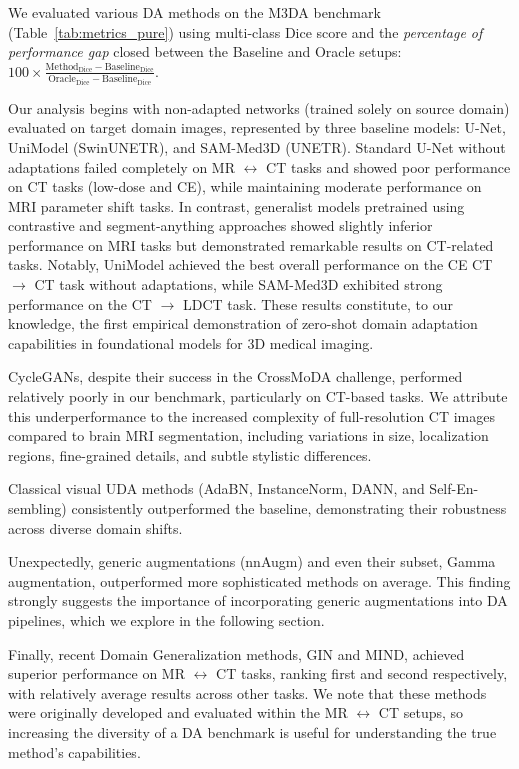 

We evaluated various DA methods on the M3DA benchmark (Table~\ref{tab:metrics_pure}) using multi-class Dice score and the \textit{percentage of performance gap} closed between the Baseline and Oracle setups: $\displaystyle 100\times \frac{\text{Method}_{\text{Dice}} - \text{Baseline}_{\text{Dice}}}{\text{Oracle}_{\text{Dice}} - \text{Baseline}_{\text{Dice}}}$.

Our analysis begins with non-adapted networks (trained solely on source domain) evaluated on target domain images, represented by three baseline models: U-Net, UniModel (SwinUNETR), and SAM-Med3D (UNETR). Standard U-Net without adaptations failed completely on MR $\leftrightarrow$ CT tasks and showed poor performance on CT tasks (low-dose and CE), while maintaining moderate performance on MRI parameter shift tasks. In contrast, generalist models pretrained using contrastive and segment-anything approaches showed slightly inferior performance on MRI tasks but demonstrated remarkable results on CT-related tasks. Notably, UniModel achieved the best overall performance on the CE CT $\rightarrow$ CT task without adaptations, while SAM-Med3D exhibited strong performance on the CT $\rightarrow$ LDCT task. These results constitute, to our knowledge, the first empirical demonstration of zero-shot domain adaptation capabilities in foundational models for 3D medical imaging.

CycleGANs, despite their success in the CrossMoDA challenge, performed relatively poorly in our benchmark, particularly on CT-based tasks. We attribute this underperformance to the increased complexity of full-resolution CT images compared to brain MRI segmentation, including variations in size, localization regions, fine-grained details, and subtle stylistic differences.

Classical visual UDA methods (AdaBN, InstanceNorm, DANN, and Self-En- sembling) consistently outperformed the baseline, demonstrating their robustness across diverse domain shifts. 

Unexpectedly, generic augmentations (nnAugm) and even their subset, Gamma augmentation, outperformed more sophisticated methods on average. This finding strongly suggests the importance of incorporating generic augmentations into DA pipelines, which we explore in the following section.

Finally, recent Domain Generalization methods, GIN and MIND, achieved superior performance on MR $\leftrightarrow$ CT tasks, ranking first and second respectively, with relatively average results across other tasks. We note that these methods were originally developed and evaluated within the MR $\leftrightarrow$ CT setups, so increasing the diversity of a DA benchmark is useful for understanding the true method's capabilities.

